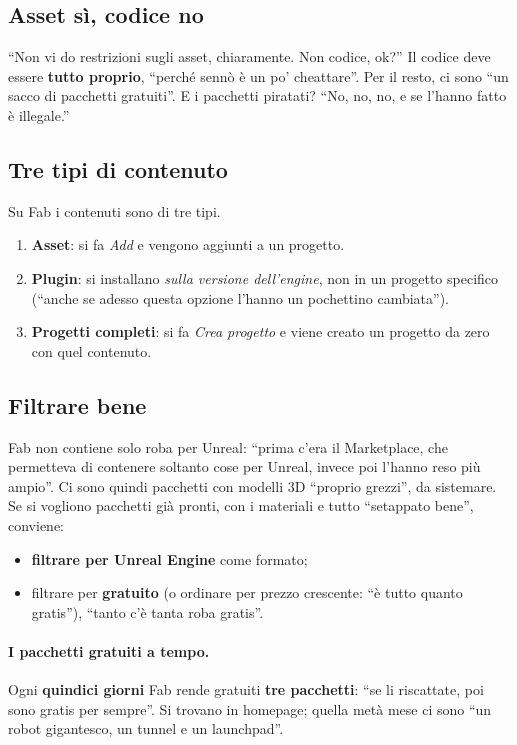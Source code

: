 \subsection{Asset sì, codice no}

``Non vi do restrizioni sugli asset, chiaramente. Non codice, ok?'' Il codice
deve essere \textbf{tutto proprio}, ``perché sennò è un po' cheattare''.
Per il resto, ci sono ``un sacco di pacchetti gratuiti''. E i pacchetti
piratati? ``No, no, no, e se l'hanno fatto è illegale.''

\subsection{Tre tipi di contenuto}

Su Fab i contenuti sono di tre tipi.
\begin{enumerate}
  \item \textbf{Asset}: si fa \emph{Add} e vengono aggiunti a un progetto.
  \item \textbf{Plugin}: si installano \emph{sulla versione dell'engine}, non
        in un progetto specifico (``anche se adesso questa opzione l'hanno un
        pochettino cambiata'').
  \item \textbf{Progetti completi}: si fa \emph{Crea progetto} e viene creato
        un progetto da zero con quel contenuto.
\end{enumerate}

\subsection{Filtrare bene}

Fab non contiene solo roba per Unreal: ``prima c'era il Marketplace, che
permetteva di contenere soltanto cose per Unreal, invece poi l'hanno reso più
ampio''. Ci sono quindi pacchetti con modelli 3D ``proprio grezzi'', da
sistemare. Se si vogliono pacchetti già pronti, con i materiali e tutto
``setappato bene'', conviene:
\begin{itemize}
  \item \textbf{filtrare per Unreal Engine} come formato;
  \item filtrare per \textbf{gratuito} (o ordinare per prezzo crescente:
        ``è tutto quanto gratis''), ``tanto c'è tanta roba gratis''.
\end{itemize}

\paragraph{I pacchetti gratuiti a tempo.} Ogni \textbf{quindici giorni} Fab
rende gratuiti \textbf{tre pacchetti}: ``se li riscattate, poi sono gratis per
sempre''. Si trovano in homepage; quella metà mese ci sono ``un robot
gigantesco, un tunnel e un launchpad''.

